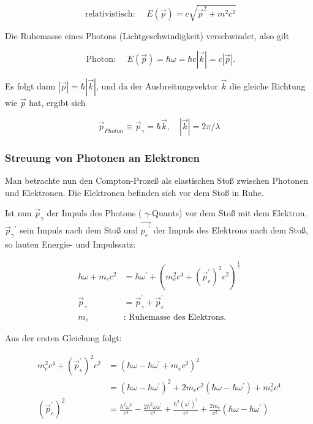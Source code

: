 \documentclass[10pt, letterpaper]{article}
\begin{document}
$$
\text { relativistisch: } \quad E(\vec{p})=c \sqrt{\vec{p}^{2}+m^{2} c^{2}}
$$

Die Ruhemasse eines Photons (Lichtgeschwindigkeit) verschwindet, also gilt

$$
\text { Photon: } \quad E(\vec{p})=\hbar \omega=\hbar c|\vec{k}|=c|\vec{p}| .
$$

Es folgt dann $|\vec{p}|=\hbar|\vec{k}|$, und da der Ausbreitungsvektor $\vec{k}$ die gleiche Richtung wie $\vec{p}$ hat, ergibt sich

$$
\vec{p}_{P h o t o n} \equiv \vec{p}_{\gamma}=\hbar \vec{k}, \quad|\vec{k}|=2 \pi / \lambda
$$

\subsubsection*{Streuung von Photonen an Elektronen}
Man betrachte nun den Compton-Prozeß als elastischen Stoß zwischen Photonen und Elektronen. Die Elektronen befinden sich vor dem Stoß in Ruhe.

Ist nun $\vec{p}_{\gamma}$ der Impuls des Photons ( $\gamma$-Quants) vor dem Stoß mit dem Elektron, $\vec{p}_{\gamma}{ }^{\prime}$ sein Impuls nach dem Stoß und $\overrightarrow{p_{e}{ }^{\prime}}$ der Impuls des Elektrons nach dem Stoß, so lauten Energie- und Impulssatz:

$$
\begin{aligned}
\hbar \omega+m_{e} c^{2} & =\hbar \omega^{\prime}+\left(m_{e}^{2} c^{4}+\left(\vec{p}_{e}^{\prime}\right)^{2} c^{2}\right)^{\frac{1}{2}} \\
\vec{p}_{\gamma} & =\vec{p}_{\gamma}^{\prime}+\vec{p}_{e}^{\prime} \\
m_{e} & : \text { Ruhemasse des Elektrons. }
\end{aligned}
$$

Aus der ersten Gleichung folgt:

$$
\begin{aligned}
m_{e}^{2} c^{4}+\left(\vec{p}_{e}^{\prime}\right)^{2} c^{2} & =\left(\hbar \omega-\hbar \omega^{\prime}+m_{e} c^{2}\right)^{2} \\
& =\left(\hbar \omega-\hbar \omega^{\prime}\right)^{2}+2 m_{e} c^{2}\left(\hbar \omega-\hbar \omega^{\prime}\right)+m_{e}^{2} c^{4} \\
\left(\vec{p}_{e}^{\prime}\right)^{2} & =\frac{\hbar^{2} \omega^{2}}{c^{4}}-\frac{2 \hbar^{2} \omega \omega^{\prime}}{c^{4}}+\frac{\hbar^{2}\left(\omega^{\prime}\right)^{2}}{c^{4}}+\frac{2 m_{e}}{c^{2}}\left(\hbar \omega-\hbar \omega^{\prime}\right)
\end{aligned}
$$
\end{document}
